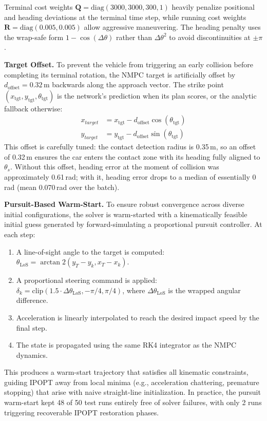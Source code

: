 \documentclass[10pt,twocolumn,letterpaper]{article}
\begin{document}
Terminal cost weights
$\mathbf{Q} = \text{diag}(3000, 3000, 300, 1)$ heavily penalize
positional and heading deviations at the terminal time step, while
running cost weights $\mathbf{R} = \text{diag}(0.005, 0.005)$ allow
aggressive maneuvering. The heading penalty uses the wrap-safe form
$1 - \cos(\Delta\theta)$ rather than $\Delta\theta^2$ to avoid
discontinuities at $\pm\pi$.

\textbf{Target Offset.} To prevent the vehicle from triggering an
early collision before completing its terminal rotation, the NMPC
target is artificially offset by $d_{\text{offset}} = 0.32$\,m
backwards along the approach vector. The strike point
$(x_{\text{tgt}}, y_{\text{tgt}}, \theta_{\text{tgt}})$ is the
network's prediction when its plan scores, or the analytic fallback
otherwise:
\begin{equation}
  \begin{aligned}
    x_{target} &= x_{\text{tgt}} - d_{\text{offset}} \cos(\theta_{\text{tgt}}) \\
    y_{target} &= y_{\text{tgt}} - d_{\text{offset}} \sin(\theta_{\text{tgt}})
  \end{aligned}
  \label{eq:offset}
\end{equation}
This offset is carefully tuned: the contact detection radius is
0.35\,m, so an offset of 0.32\,m ensures the car enters the contact
zone with its heading fully aligned to $\theta_s$. Without this
offset, heading error at the moment of collision was approximately
0.61\,rad; with it, heading error drops to a median of essentially
0\,rad (mean 0.070\,rad over the batch).

\textbf{Pursuit-Based Warm-Start.} To ensure robust convergence
across diverse initial configurations, the solver is warm-started with
a kinematically feasible initial guess generated by
forward-simulating a proportional pursuit controller. At each step:
\begin{enumerate}
    \item A line-of-sight angle to the target is computed:
      $\theta_{\text{LoS}} = \arctan2(y_T - y_k, x_T - x_k)$.
    \item A proportional steering command is applied:
      $\delta_k = \text{clip}(1.5 \cdot \Delta\theta_{\text{LoS}},
      -\pi/4, \pi/4)$, where $\Delta\theta_{\text{LoS}}$ is the
      wrapped angular difference.
    \item Acceleration is linearly interpolated to reach the desired
      impact speed by the final step.
    \item The state is propagated using the same RK4 integrator as the
      NMPC dynamics.
\end{enumerate}
This produces a warm-start trajectory that satisfies all kinematic
constraints, guiding IPOPT away from local minima (e.g., acceleration
chattering, premature stopping) that arise with naive straight-line
initialization. In practice, the pursuit warm-start kept 48 of 50 test
runs entirely free of solver failures, with only 2 runs triggering
recoverable IPOPT restoration phases.
\end{document}
